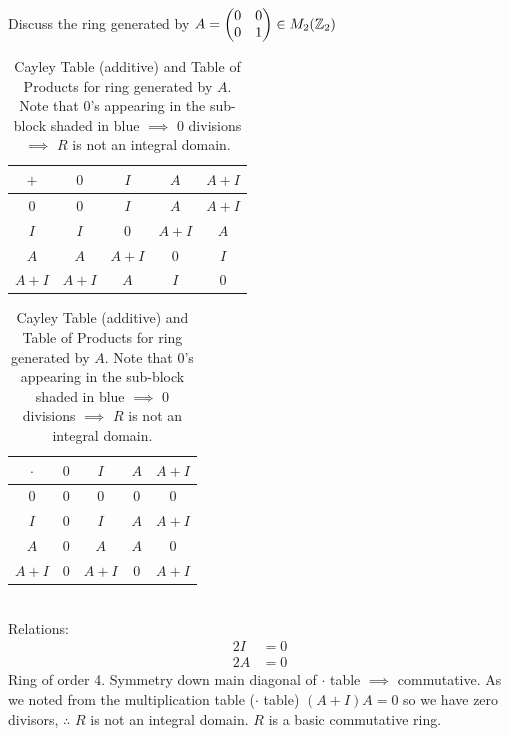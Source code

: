 \begin{example} 
Discuss the ring generated by $A= \begin{pmatrix}
    0&0\\0&1
\end{pmatrix} \in M_2({\mathbb{ Z}}_2)$
    \begin{table}[h!]
    \centering
    \begin{tabular}{c||c|c|c|c|}
         $+$& $0$&$I$&$A$&$A+I$  \\ \hline \hline
         $0$&$0$&$I$&$A$&$A+I$\\ \hline
         $I$&$I$&$0$&$A+I$&$A$ \\ \hline
         $A$&$A$&$A+I$&$0$&$I$ \\ \hline
         $A+I$&$A+I$&$A$&$I$&$0$ \\ \hline
    \end{tabular} \hspace{0.2in}
    \begin{tabular}{c||c|c|c|c|}
         $\cdot$& $0$&$I$&$A$&$A+I$  \\ \hline \hline
         $0$&$0$&$0$&$0$&$0$\\ \hline
         $I$&$0$&\cellcolor{blue!25}$I$&\cellcolor{blue!25}$A$&\cellcolor{blue!25}$A+I$ \\ \hline
         $A$&$0$&\cellcolor{blue!25}$A$&\cellcolor{blue!25}$A$&\cellcolor{blue!25}$0$ \\ \hline
         $A+I$&$0$&\cellcolor{blue!25}$A+I$&\cellcolor{blue!25}$0$&\cellcolor{blue!25}$A+I$ \\ \hline
    \end{tabular}
    \caption{Cayley Table (additive) and Table of Products for ring generated by $A$. Note that $0$'s appearing in the sub-block shaded in blue $\implies$ 0 divisions $\implies$ $R$ is not an integral domain.}
    \label{tab:Cayley_and_products_ex_ring}
\end{table}\\
Relations:
\begin{align}
    2I&=0 \nonumber \\
    2A&=0 \nonumber
\end{align}
Ring of order 4. Symmetry down main diagonal of $\cdot$ table $\implies$ commutative. As we noted from the multiplication table ($\cdot$ table) $(A+I)A=0$ so we have zero divisors, $\therefore$ $R$ is not an integral domain. $R$ is a basic commutative ring.\\
\begin{figure}[h!]
    \centering

\end{figure}
\end{example}
